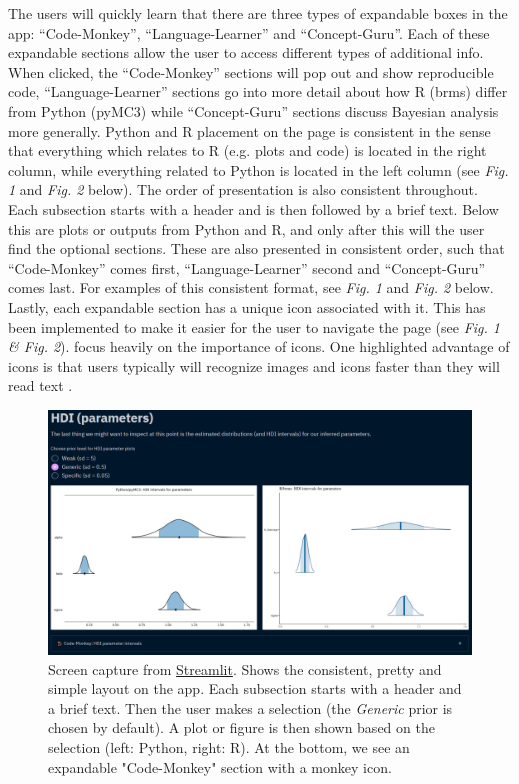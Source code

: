\documentclass[12pt]{article}
\begin{document}
\vspace{5mm}

The users will quickly learn that there are three types of expandable boxes in the app:
“Code-Monkey”, “Language-Learner” and “Concept-Guru”. Each of these expandable sections
allow the user to access different types of additional info. When clicked, the “Code-Monkey”
sections will pop out and show reproducible code, “Language-Learner” sections go into more detail
about how R (brms) differ from Python (pyMC3) while “Concept-Guru” sections discuss Bayesian analysis
more generally. Python and R placement on the page is consistent in the sense
that everything which relates to R (e.g. plots and code) is located in the
right column, while everything related to Python is located in the left column
(see \emph{Fig. 1} and \emph{Fig. 2} below).
The order of presentation is also consistent throughout.
Each subsection starts with a header and is then followed by a brief text.
Below this are plots or outputs from Python and R, and only after this will the user find
the optional sections. These are also presented in consistent order, such that “Code-Monkey” comes first,
“Language-Learner” second and “Concept-Guru” comes last. For examples of this
consistent format, see \emph{Fig. 1} and \emph{Fig. 2} below.
Lastly, each expandable section
has a unique icon associated with it. This has been implemented to make it easier for the
user to navigate the page (see \emph{Fig. 1 \& Fig. 2}). \textcite[223-255]{mills1992macintosh} focus
heavily on the importance of icons. One highlighted advantage of icons is that users typically
will recognize images and icons faster than they will read text
\autocite[244]{mills1992macintosh}.

\begin{figure}[H]
    \centerline{\includegraphics[scale = 0.5]{../img/Pretty-Consistent.png}}
    \caption{Screen capture from
	    \href{https://share.streamlit.io/victor-m-p/bayesworkflow/main/BayesWorkflow.py}{Streamlit}.
    Shows the consistent, pretty and simple layout on the app.
    Each subsection starts with a header and a brief text.
    Then the user makes a selection (the \emph{Generic} prior is chosen by
    default). A plot or figure is then shown based on the selection (left: Python, right:
    R). At the bottom, we see an expandable "Code-Monkey" section with a monkey icon.
    }
\end{figure}
\end{document}
